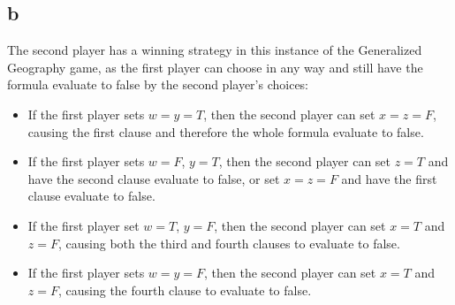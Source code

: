\documentclass[letterpaper,notitlepage,twoside]{article}
\begin{document}
\subsection*{b}
The second player has a winning strategy in this instance of the Generalized Geography game, as the first player can choose in any way and still have the formula evaluate to false by the second player's choices: 
\begin{itemize}
\item If the first player sets $w=y=T$, then the second player can set $x=z=F$, causing the first clause and therefore the whole formula evaluate to false. \\
\item If the first player sets $w = F$, $y = T$, then the second player can set $z = T$ and have the second clause evaluate to false, or set $x = z = F$ and have the first clause evaluate to false. \\
\item If the first player set $w = T$, $y = F$, then the second player can set $x = T$ and $z = F$, causing both the third and fourth clauses to evaluate to false. \\
\item If the first player sets $w=y=F$, then the second player can set $x = T$ and $z = F$, causing the fourth clause to evaluate to false. \\
\end{itemize}
\end{document}
